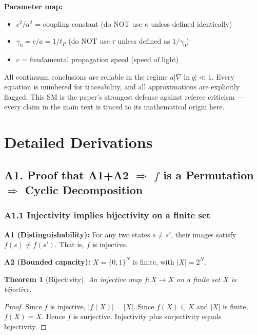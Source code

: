 \documentclass[reprint]{revtex4-2}
\newtheorem{theorem}{Theorem}
\begin{document}
\textbf{Parameter map:}
\begin{itemize}
\item $c^2/a^2$ = coupling constant (do NOT use $\kappa$ unless defined identically)
\item $\gamma_0 = c/a = 1/t_P$ (do NOT use $\tau$ unless defined as $1/\gamma_0$)
\item $c$ = fundamental propagation speed (speed of light)
\end{itemize}

All continuum conclusions are reliable in the regime $a|\nabla\ln q| \ll 1$. Every equation is numbered for traceability, and all approximations are explicitly flagged. This SM is the paper's strongest defense against referee criticism --- every claim in the main text is traced to its mathematical origin here.

\section{Detailed Derivations}

\subsection{A1. Proof that A1+A2 $\Rightarrow$ $f$ is a Permutation $\Rightarrow$ Cyclic Decomposition}

\subsubsection{A1.1 Injectivity implies bijectivity on a finite set}

\textbf{A1 (Distinguishability):} For any two states $s\neq s'$, their images satisfy $f(s)\neq f(s')$. That is, $f$ is injective.

\textbf{A2 (Bounded capacity):} $X=\{0,1\}^N$ is finite, with $|X|=2^N$.

\begin{theorem}[Bijectivity]
\label{thm:bijectivity}
An injective map $f:X\to X$ on a finite set $X$ is bijective.
\end{theorem}

\begin{proof}
Since $f$ is injective, $|f(X)| = |X|$. Since $f(X)\subseteq X$ and $|X|$ is finite, $f(X)=X$. Hence $f$ is surjective. Injectivity plus surjectivity equals bijectivity.
\end{proof}
\end{document}
